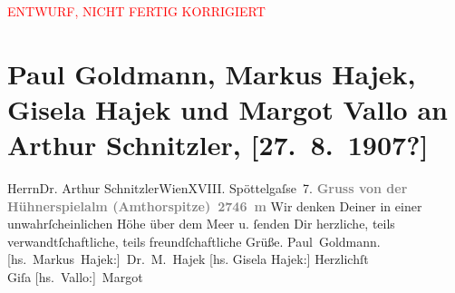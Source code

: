 
\begin{center}
            \textcolor{red}{ENTWURF, NICHT FERTIG KORRIGIERT}
                      \end{center}
            
         
         \renewcommand{\erwaehntePersonen}{Personen: Paul Goldmann, Markus Hajek, Gisela Hajek, Margot Vallo}
         \renewcommand{\erwaehnteOrte}{Orte: Edmund-Weiß-Gasse 7, Gossensass, Hühnerspiel, Hühnerspielalm, Wien}
         \renewcommand{\erwaehnteWerke}{}
               \section[Paul Goldmann, Markus Hajek, Gisela Hajek und Margot Vallo an Arthur Schnitzler, {[}27. 8. 1907?{]}]{ Paul Goldmann, Markus Hajek, Gisela Hajek und Margot Vallo an Arthur
               Schnitzler, {[}27. 8. 1907?{]}}\nopagebreak{}\rehead{ }\begin{ledgroupsized}[t]{13cm}\normalsize\beginnumbering \toendnotes[C]{\smallbreak\pagebreak[2]} 
\pstart{}{\pb}Herrn\pend{}\pstart{}Dr. Arthur Schnitzler\pend{}\pstart{}Wien\pend{}\pstart{}XVIII. Spöttelgaſse 7.\pend{}{\bigskip}\pstart
           \noindent{}\centering{}{\pb}\textcolor{gray}{\textbf{Gruss von der Hühnerspielalm (Amthorspitze) 2746 m}}\pend
           \pstart
           \noindent{}{\pb}Wir denken Deiner in einer unwahrſcheinlichen Höhe
               über dem Meer u. ſenden Dir herzliche, teils verwandtſchaftliche, teils
               freundſchaftliche Grüße. \spacefill\mbox{Paul Goldmann.}\pend
           \pstart
           \spacefill\mbox{{[}hs. Markus Hajek:{]} Dr. M. Hajek}\pend
           \pstart
           {[}hs. Gisela Hajek:{]} Herzlichſt {\\}\spacefill\mbox{Giſa}\pend
           \pstart
           \spacefill\mbox{{[}hs. Vallo:{]} Margot}\pend
           

\end{ledgroupsized}
